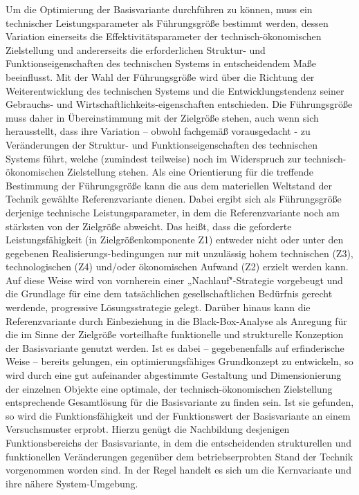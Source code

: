\documentclass[12pt,a4paper]{article}
\begin{document}
Um die Optimierung der Basisvariante durchführen zu können, muss ein
technischer Leistungsparameter als Führungsgröße bestimmt werden, dessen
Variation einerseits die Effektivitätsparameter der technisch-ökonomischen
Zielstellung und andererseits die erforderlichen Struktur- und
Funktionseigenschaften des technischen Systems in entscheidendem Maße
beeinflusst. Mit der Wahl der Führungsgröße wird über die Richtung der
Weiterentwicklung des technischen Systems und die Entwicklungstendenz seiner
Gebrauchs- und Wirtschaftlichkeits-eigenschaften entschieden. Die
Führungsgröße muss daher in Übereinstimmung mit der Zielgröße stehen, auch
wenn sich herausstellt, dass ihre Variation -- obwohl fachgemäß vorausgedacht -
zu Veränderungen der Struktur- und Funktionseigenschaften des technischen
Systems führt, welche (zumindest teilweise) noch im Widerspruch zur
technisch-ökonomischen Zielstellung stehen. Als eine Orientierung für die
treffende Bestimmung der Führungsgröße kann die aus dem materiellen Weltstand
der Technik gewählte Referenzvariante dienen. Dabei ergibt sich als
Führungsgröße derjenige technische Leistungsparameter, in dem die
Referenzvariante noch am stärksten von der Zielgröße abweicht. Das heißt, dass
die geforderte Leistungsfähigkeit (in Zielgrößenkomponente Z1) entweder nicht
oder unter den gegebenen Realisierungs-bedingungen nur mit unzulässig hohem
technischen (Z3), technologischen (Z4) und/oder ökonomischen Aufwand (Z2)
erzielt werden kann. Auf diese Weise wird von vornherein einer
„Nachlauf"-Strategie vorgebeugt und die Grundlage für eine dem tatsächlichen
gesellschaftlichen Bedürfnis gerecht werdende, progressive Lösungsstrategie
gelegt. Darüber hinaus kann die Referenzvariante durch Einbeziehung in die
Black-Box-Analyse als Anregung für die im Sinne der Zielgröße vorteilhafte
funktionelle und strukturelle Konzeption der Basisvariante genutzt werden. Ist
es dabei -- gegebenenfalls auf erfinderische Weise -- bereits gelungen, ein
optimierungsfähiges Grundkonzept zu entwickeln, so wird durch eine gut
aufeinander abgestimmte Gestaltung und Dimensionierung der einzelnen Objekte
eine optimale, der technisch-ökonomischen Zielstellung entsprechende
Gesamtlösung für die Basisvariante zu finden sein. Ist sie gefunden, so wird
die Funktionsfähigkeit und der Funktionswert der Basisvariante an einem
Versuchsmuster erprobt. Hierzu genügt die Nachbildung desjenigen
Funktionsbereichs der Basisvariante, in dem die entscheidenden strukturellen
und funktionellen Veränderungen gegenüber dem betriebserprobten Stand der
Technik vorgenommen worden sind. In der Regel handelt es sich um die
Kernvariante und ihre nähere System-Umgebung.
\end{document}
